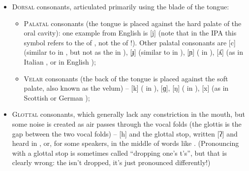 \begin{refsection}
\begin{itemize}
\begin{itemize}
        \item \textsc{(Inter)dental} consonants (\textit{inter} = `between', \textit{dental} \Rightarrow\ the tongue is placed between, or just on, the teeth) – [{θ}] ( in ), [{ð}] ( in );
        \item \textsc{Alveolar} consonants (the tip of the tongue is placed on or near the alveolar ridge, the little protrusion just behind the upper teeth) – in English, [{t}], [{d}], [{s}], [{z}], [{n}], [{l}] are all usually alveolar, as is [{r}] in some languages other than English;\footnote{In most linguistics problems, the sound [{r}] is treated as an alveolar sound, unless the footnotes state differently.}
        \item \textsc{Post-alveolar} consonants (\textit{post} = ‘after’\ \Rightarrow\ the tongue is placed further behind than the alveolar ridge) – [{ʃ}] ( in ), [{ʒ}] ( in ), [{tʃ}] ( in ), [{dʒ}] ( in ); in many varieties of English, [ɹ] is also post-alveolar;
    \end{itemize}
    \item \textsc{Dorsal} consonants, articulated primarily using the blade of the tongue:
    \begin{itemize}

        \item \textsc{Palatal} consonants (the tongue is placed against the hard palate of the oral cavity): one example from English is [{j}] (note that in the IPA this symbol refers to the  of , not the  of !). Other palatal consonants are [{c}] (similar to  in , but not as the  in ), [{ɟ}] (similar to  in ), [{ɲ}] ( in ), [{ʎ}] (as in Italian , or in English );
        \item \textsc{Velar} consonants (the back of the tongue is placed against the soft palate, also known as the velum) – [{k}] ( in ), [{ɡ}], [{ŋ}] ( in ), [{x}] (as in Scottish  or German );
    \end{itemize}
    \item \textsc{Glottal} consonants, which generally lack any constriction in the mouth, but some noise is created as air passes through the vocal folds (the glottis is the gap between the two vocal folds) – [{h}] and the glottal stop, written [{ʔ}] and heard in , or, for some speakers, in the middle of words like . (Pronouncing  with a glottal stop is sometimes called “dropping one's t's”, but that is clearly wrong: the  isn't dropped, it's just pronounced differently!)
\end{itemize}


\end{refsection}
